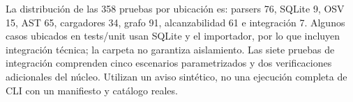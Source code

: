 
La distribución de las 358 pruebas por ubicación es: parsers 76, SQLite 9, OSV 15, AST 65, cargadores 34, grafo 91, alcanzabilidad 61 e integración 7. Algunos casos ubicados en tests/unit usan SQLite y el importador, por lo que incluyen integración técnica; la carpeta no garantiza aislamiento. Las siete pruebas de integración comprenden cinco escenarios parametrizados y dos verificaciones adicionales del núcleo. Utilizan un aviso sintético, no una ejecución completa de CLI con un manifiesto y catálogo reales.

